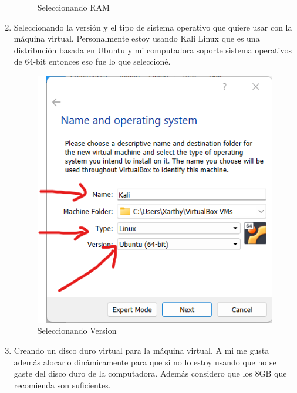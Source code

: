 \documentclass[stu, 12pt, letterpaper, donotrepeattitle, floatsintext, natbib, helv]{apa7}
\begin{document}
\begin{enumerate}
\begin{figure} [H]
        \caption{Seleccionando RAM}
        \label{fig:RAM}
    \end{figure}
    \item Seleccionando la versión y el tipo de sistema operativo que quiere usar con la máquina virtual. Personalmente estoy usando Kali Linux que es una distribución basada en Ubuntu y mi computadora soporte sistema operativos de 64-bit entonces eso fue lo que seleccioné.
    \begin{figure} [H]
        \includegraphics[width = 1\textwidth]{Version.png}
        \caption{Seleccionando Version}
        \label{fig:Version}
    \end{figure}
    \item Creando un disco duro virtual para la máquina virtual. A mi me gusta además alocarlo dinámicamente para que si no lo estoy usando que no se gaste del disco duro de la computadora. Además considero que los 8GB que recomienda son suficientes.
    \begin{figure} [H]

\end{figure}
\end{enumerate}
\end{document}
